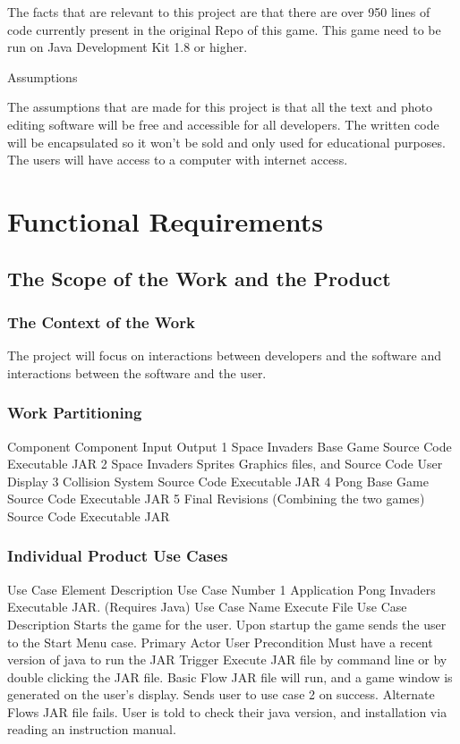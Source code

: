 \documentclass[12pt, titlepage]{article}
\begin{document}
The facts that are relevant to this project are that there are over 950 lines of code currently present in the original Repo of this game. This game need %
to be run on Java Development Kit 1.8 or higher.

Assumptions

The assumptions that are made for this project  is that all the text and photo editing software will be free and accessible for all developers. The written code will be encapsulated so it won’t %
 be sold and only used for educational purposes. The users will have access to a computer with internet access. 

\section{Functional Requirements}
\subsection{The Scope of the Work and the Product}
\subsubsection{The Context of the Work}
The project will focus on interactions between developers and the software and interactions between the software and the user.

\subsubsection{Work Partitioning}

Component 
Component
Input
Output
1
Space Invaders Base Game
Source Code
Executable JAR
2
Space Invaders Sprites
Graphics files, and Source Code
User Display
3
Collision System
Source Code
Executable JAR
4
Pong Base Game
Source Code
Executable JAR
5
Final Revisions (Combining the two games)
Source Code
Executable JAR

\subsubsection{Individual Product Use Cases}
Use Case Element
Description
Use Case Number
1
Application
Pong Invaders Executable JAR. (Requires Java)
Use Case Name
Execute File
Use Case Description
Starts the game for the user. Upon startup the game sends the user to the Start Menu case.
Primary Actor
User 
Precondition
Must have a recent version of java to run the JAR
Trigger
Execute JAR file by command line or by double clicking the JAR file.
Basic Flow
JAR file will run, and a game window is generated on the user’s display. Sends user to use case 2 on success.
Alternate Flows
JAR file fails. User is told to check their java version, and installation via reading an instruction manual.
\end{document}
